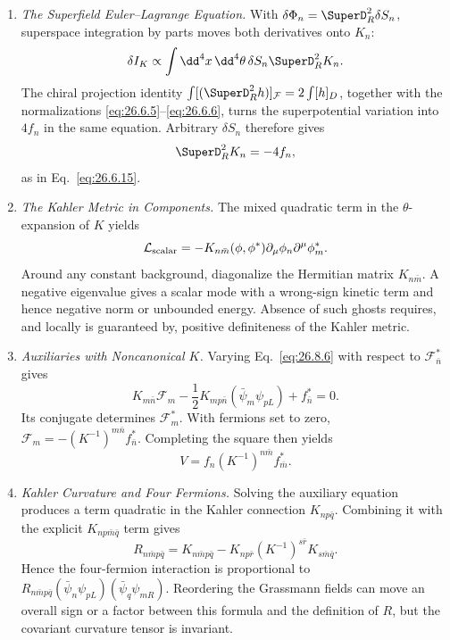 \begin{enumerate}
  \begin{enumerate}
    \item \emph{The Superfield Euler--Lagrange Equation.}
    With \(\delta\Phi_n=\SuperD_R^2\delta S_n\), superspace integration by
      parts moves both derivatives onto \(K_n\):
      \[
        \delta I_K\propto
          \int \dd^4x\,\dd^4\theta\,
          \delta S_n\SuperD_R^2K_n .
      \]
      The chiral projection identity
      \(\int[(\SuperD_R^2h)]_{\mathcal F}
        =2\int[h]_D\), together with the normalizations
      \eqref{eq:26.6.5}--\eqref{eq:26.6.6}, turns the superpotential variation
      into \(4f_n\) in the same equation.  Arbitrary \(\delta S_n\) therefore
      gives
      \[
        \SuperD_R^2K_n=-4f_n,
      \]
      as in Eq.~\eqref{eq:26.6.15}.
    \item \emph{The Kahler Metric in Components.}
    The mixed quadratic term in the \(\theta\)-expansion of \(K\) yields
      \[
        \mathcal L_{\rm scalar}
          =-K_{n\bar m}(\phi,\phi^*)
            \partial_\mu\phi_n\partial^\mu\phi_m^* .
      \]
      Around any constant background, diagonalize the Hermitian matrix
      \(K_{n\bar m}\).  A negative eigenvalue gives a scalar mode with a
      wrong-sign kinetic term and hence negative norm or unbounded energy.
      Absence of such ghosts requires, and locally is guaranteed by, positive
      definiteness of the Kahler metric.
    \item \emph{Auxiliaries with Noncanonical \(K\).}
    Varying Eq.~\eqref{eq:26.8.6} with respect to
      \(\mathcal F_{\bar n}^*\) gives
      \[
        K_{m\bar n}\mathcal F_m
          -\frac12K_{mp\bar n}(\bar\psi_m\psi_{pL})
          +f_{\bar n}^*=0.
      \]
      Its conjugate determines \(\mathcal F_m^*\).  With fermions set to zero,
      \(\mathcal F_m=-(K^{-1})^{m\bar n}f_{\bar n}^*\).  Completing the
      square then yields
      \[
        V=f_n(K^{-1})^{n\bar m}f_{\bar m}^*.
      \]
    \item \emph{Kahler Curvature and Four Fermions.}
    Solving the auxiliary equation produces a term quadratic in the Kahler
      connection \(K_{np\bar q}\).  Combining it with the explicit
      \(K_{np\bar m\bar q}\) term gives
      \[
        R_{n\bar m p\bar q}
          =K_{n\bar m p\bar q}
           -K_{np\bar r}(K^{-1})^{s\bar r}K_{s\bar m\bar q}.
      \]
      Hence the four-fermion interaction is proportional to
      \(R_{n\bar m p\bar q}
      (\bar\psi_n\psi_{pL})(\bar\psi_q\psi_{mR})\).
      Reordering the Grassmann fields can move an overall sign or a factor
      between this formula and the definition of \(R\), but the covariant
      curvature tensor is invariant.
  \end{enumerate}


\end{enumerate}
